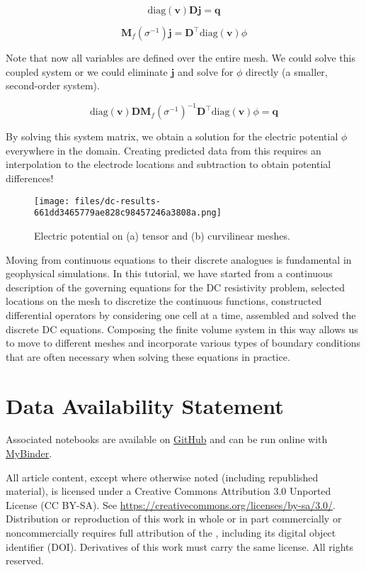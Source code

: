 \documentclass[Journal,InsideFigs,DoubleSpace,12pt,letterpaper]{ascelike-new}
\begin{document}
\begin{equation}
\text{diag}(\mathbf{v}) \mathbf{D}\mathbf{j} = \mathbf{q}
\end{equation}

\begin{equation}
\mathbf{M}_f(\sigma^{-1}) \mathbf{j} = \mathbf{D}^\top \text{diag}(\mathbf{v})\phi
\end{equation}

Note that now all variables are defined over the entire mesh. We could solve this coupled system or we could eliminate $\mathbf{j}$ and solve for $\phi$ directly (a smaller, second-order system).

\begin{equation}
\text{diag}({\mathbf{v}}) \mathbf{D}\mathbf{M}_f(\sigma^{-1})^{-1}\mathbf{D}^\top\text{diag}({\mathbf{v}})\phi = \mathbf{q}
\end{equation}

By solving this system matrix, we obtain a solution for the electric potential $\phi$ everywhere in the domain. Creating predicted data from this requires an interpolation to the electrode locations and subtraction to obtain potential differences!

\begin{figure}[!htbp]
\centering
\texttt{[image: files/dc-results-661dd3465779ae828c98457246a3808a.png]}
\caption{Electric potential on (a) tensor and (b) curvilinear meshes.}
\label{fig-results}
\end{figure}

Moving from continuous equations to their discrete analogues is fundamental in geophysical simulations. In this tutorial, we have started from a continuous description of the governing equations for the DC resistivity problem, selected locations on the mesh to discretize the continuous functions, constructed differential operators by considering one cell at a time, assembled and solved the discrete DC equations. Composing the finite volume system in this way allows us to move to different meshes and incorporate various types of boundary conditions that are often necessary when solving these equations in practice.

\section*{Data Availability Statement}
Associated notebooks are available on \href{https://github.com/simpeg/tle-finitevolume}{GitHub} and can be run online with \href{http://mybinder.org/repo/simpeg/tle-finitevolume}{MyBinder}.


\appendix

All article content, except where otherwise noted (including republished material), is licensed under a Creative Commons Attribution 3.0 Unported License (CC BY-SA). See \href{https://creativecommons.org/licenses/by-sa/3.0/}{https://creativecommons.org/licenses/by-sa/3.0/}. Distribution or reproduction of this work in whole or in part commercially or noncommercially requires full attribution of the \cite{Cockett_2016}, including its digital object identifier (DOI). Derivatives of this work must carry the same license. All rights reserved.


\end{document}
